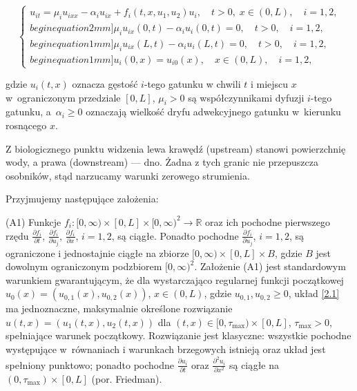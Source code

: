 	\begin{equation}
		\label{2.1}
		\begin{cases}
			u_{it}=\mu_i  u_{ixx}  -\alpha_i  u_{ix} + f_i(t,x,u_1,u_2)u_i, \quad t>0,\; x\in (0,L),\quad i=1,2, \\begin{equation}2mm]
			\mu_i u_{ix}(0,t) - \alpha_i u_i(0,t)=0, \quad t>0, \quad i=1,2, \\begin{equation}1mm]
			\mu_i u_{ix}(L,t) - \alpha_i u_i(L,t) = 0, \quad t>0, \quad i=1,2,\\begin{equation}1mm]
			u_i(0,x)=u_{i0}(x), \quad x\in (0,L),\quad i=1,2,
		\end{cases}
	\end{equation}
	
	gdzie $u_i(t,x)$ oznacza gęstość $i$-tego gatunku w chwili $t$ i miejscu $x$ w~ograniczonym przedziale $[0,L]$,  
	$\mu_i>0$ są współczynnikami dyfuzji $i$-tego gatunku, a~$\alpha_i\ge 0$ oznaczają wielkość dryfu adwekcyjnego gatunku w~kierunku rosnącego $x$.  
	
	Z biologicznego punktu widzenia lewa krawędź (upstream) stanowi powierzchnię wody, a prawa (downstream) — dno.  
	Żadna z tych granic nie przepuszcza osobników, stąd narzucamy warunki zerowego strumienia.
	
	\vspace{3mm}
	
	Przyjmujemy następujące założenia:
	
	(A1) Funkcje $f_i:[0,\infty)\times [0,L]\times [0,\infty)^2 \to \mathbb{R}$ oraz ich pochodne pierwszego rzędu  
	$\frac{\partial f_i}{\partial t}$, $\frac{\partial f_i}{\partial u_j}$, $\frac{\partial f_i}{\partial x}$, $i=1,2$, są ciągłe.  
	Ponadto pochodne $\frac{\partial f_i}{\partial u_j}$, $i=1,2$, są ograniczone i jednostajnie ciągłe na zbiorze  
	$[0,\infty)\times [0,L]\times B$, gdzie $B$ jest dowolnym ograniczonym podzbiorem $[0,\infty)^2$.
	\newline
	Założenie (A1) jest standardowym warunkiem gwarantującym, że dla wystarczająco regularnej funkcji początkowej  
	$u_0(x)=(u_{0,1}(x),u_{0,2}(x))$, $x\in(0,L)$, gdzie $u_{0,1},u_{0,2}\ge 0$, układ \eqref{2.1} ma jednoznaczne, maksymalnie określone rozwiązanie  
	$u(t,x)=(u_1(t,x),u_2(t,x))$ dla $(t,x)\in [0,\tau_{\max})\times [0,L]$, $\tau_{\max}>0$, spełniające warunek początkowy.  
	Rozwiązanie jest klasyczne: wszystkie pochodne występujące w~równaniach i warunkach brzegowych istnieją oraz układ jest spełniony punktowo;  
	ponadto pochodne $\frac{\partial u_i}{\partial t}$ oraz $\frac{\partial^2 u_i}{\partial x^2}$ są ciągłe na $(0,\tau_{\max})\times [0,L]$ (por. Friedman).
	
